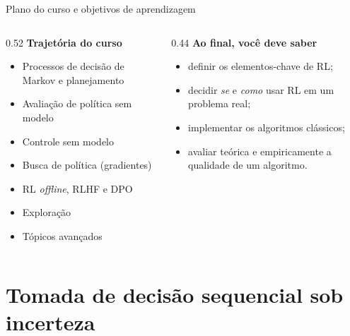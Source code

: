 \documentclass[aspectratio=169, 11pt]{beamer}
\begin{document}
\begin{frame}{Plano do curso e objetivos de aprendizagem}
  \begin{columns}[T]
    \begin{column}{0.52\textwidth}
      \textbf{Trajetória do curso}
      \begin{itemize}\setlength{\itemsep}{0.2ex}
        \item Processos de decisão de Markov e planejamento
        \item Avaliação de política sem modelo
        \item Controle sem modelo
        \item Busca de política (gradientes)
        \item RL \emph{offline}, RLHF e DPO
        \item Exploração
        \item Tópicos avançados
      \end{itemize}
    \end{column}
    \begin{column}{0.44\textwidth}
      \textbf{Ao final, você deve saber}
      \begin{itemize}\setlength{\itemsep}{0.2ex}
        \item definir os elementos-chave de RL;
        \item decidir \emph{se} e \emph{como} usar RL em um problema real;
        \item implementar os algoritmos clássicos;
        \item avaliar teórica e empiricamente a qualidade de um algoritmo.
      \end{itemize}
    \end{column}
  \end{columns}
\end{frame}

\section{Tomada de decisão sequencial sob incerteza}
\end{document}
